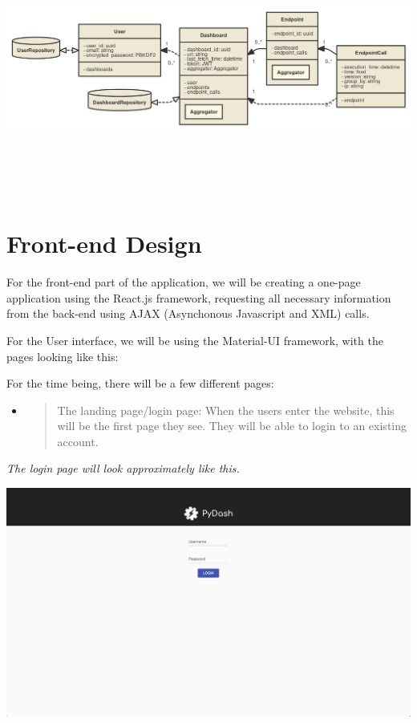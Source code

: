 \includegraphics[width=\pagewidth]{media/image31.png}

\hypertarget{section-6}{%
\section{\texorpdfstring{\\
}{ }}\label{section-6}}

\hypertarget{front-end-design}{%
\section{Front-end Design}\label{front-end-design}}

For the front-end part of the application, we will be creating a
one-page application using the React.js framework, requesting all
necessary information from the back-end using AJAX (Asynchonous
Javascript and XML) calls.

For the User interface, we will be using the Material-UI framework, with
the pages looking like this:

For the time being, there will be a few different pages:

\begin{itemize}
\item
  \begin{quote}
  The landing page/login page: When the users enter the website, this
  will be the first page they see. They will be able to login to an
  existing account.
  \end{quote}
\end{itemize}

\emph{The login page will look approximately like this.}

\includegraphics[width=\pagewidth]{media/image28.png}

